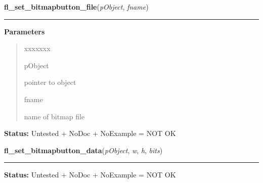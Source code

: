     \label{xformslib:library:fl_set_bitmap_file}

    \vspace{0.5ex}

\hspace{.8\funcindent}\begin{boxedminipage}{\funcwidth}

    \raggedright \textbf{fl\_set\_bitmapbutton\_file}(\textit{pObject}, \textit{fname})

    \vspace{-1.5ex}

    \rule{\textwidth}{0.5\fboxrule}
\setlength{\parskip}{2ex}
\setlength{\parskip}{1ex}
      \textbf{Parameters}
      \vspace{-1ex}

      \begin{quote}
        \begin{Ventry}{xxxxxxx}

          \item[pObject]

          pointer to object

          \item[fname]

          name of bitmap file

        \end{Ventry}

      \end{quote}

\textbf{Status:} Untested + NoDoc + NoExample = NOT OK



    \end{boxedminipage}

    \label{xformslib:library:fl_set_bitmapbutton_data}

    \vspace{0.5ex}

\hspace{.8\funcindent}\begin{boxedminipage}{\funcwidth}

    \raggedright \textbf{fl\_set\_bitmapbutton\_data}(\textit{pObject}, \textit{w}, \textit{h}, \textit{bits})

    \vspace{-1.5ex}

    \rule{\textwidth}{0.5\fboxrule}
\setlength{\parskip}{2ex}
\setlength{\parskip}{1ex}
\textbf{Status:} Untested + NoDoc + NoExample = NOT OK



    \end{boxedminipage}

